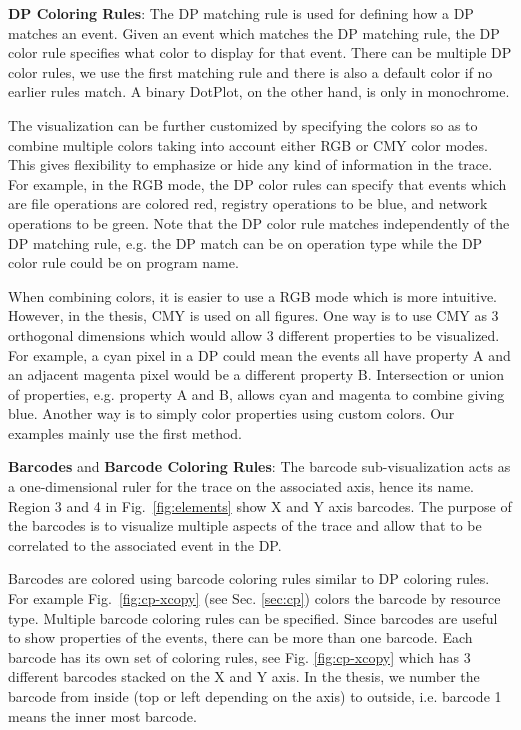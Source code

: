 {\bf DP Coloring Rules}:
The DP matching rule is used for defining how a DP matches
an event. Given an event which matches the DP matching rule,
the DP color rule specifies what color to display for that event.
There can be multiple DP color rules, we use the first matching
rule and there is also a default color if no earlier rules match.
A binary DotPlot, on the other hand, is only in monochrome.

The visualization can be further customized by specifying the colors so
as to combine multiple colors taking
into account either RGB or CMY color modes.
This gives flexibility to emphasize or hide any kind of information
in the trace.
For example, in the RGB mode, the DP color rules
can specify that events which are
file operations are colored red, 
registry operations to be blue, and network operations to be green.
Note that the DP color rule matches independently of the DP matching rule,
e.g. the DP match can be on operation type while the DP color rule could be
on program name.

When combining colors, it is easier to use a RGB mode which is
more intuitive. However, in the thesis, CMY is used on all figures.
One way is to use CMY as 3 orthogonal dimensions which would allow 3 different
properties to be visualized.
For example, a cyan pixel in a DP could mean
the events all have property A and an adjacent magenta pixel 
would be a different property B. 
Intersection or union of properties, e.g. property A and B,
allows cyan and magenta to combine giving blue.
Another way is to simply color properties using custom colors.
Our examples mainly use the first method.

{\bf Barcodes} and {\bf Barcode Coloring Rules}:
The barcode sub-visualization
acts as a one-dimensional ruler for the trace on the associated axis, hence its name.
Region 3 and 4 in Fig.~\ref{fig:elements} show X and Y axis barcodes.
The purpose of the barcodes is to visualize multiple aspects of
the trace and allow that to be correlated to the associated event in the DP.

Barcodes are colored using
barcode coloring rules similar to DP coloring rules.
For example Fig.~\ref{fig:cp-xcopy} (see Sec. \ref{sec:cp})
colors the barcode by resource type.
Multiple barcode coloring rules can be specified.
Since barcodes are useful to show properties of the events,
there can be more than one barcode. Each barcode has its own
set of coloring rules, see Fig. \ref{fig:cp-xcopy} which has 3 different
barcodes stacked on the X and Y axis.
In the thesis, we number the barcode from inside (top or left depending
on the axis) to outside, i.e. barcode 1 means the inner most barcode.

